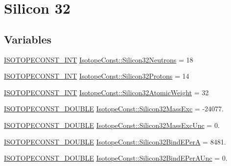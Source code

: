 \hypertarget{group___isotope_const-_silicon-_si32}{}\section{Silicon 32}
\label{group___isotope_const-_silicon-_si32}
\subsection*{Variables}
\begin{DoxyCompactItemize}
\item 
\mbox{\hyperlink{group___isotope_const-_macros_ga5f18360b3e99483a35c32d789e62621c}{I\+S\+O\+T\+O\+P\+E\+C\+O\+N\+S\+T\+\_\+\+I\+NT}} \mbox{\hyperlink{group___isotope_const-_silicon-_si32_ga544771607af4601906b75ff26619ab67}{Isotope\+Const\+::\+Silicon32\+Neutrons}} = 18
\item 
\mbox{\hyperlink{group___isotope_const-_macros_ga5f18360b3e99483a35c32d789e62621c}{I\+S\+O\+T\+O\+P\+E\+C\+O\+N\+S\+T\+\_\+\+I\+NT}} \mbox{\hyperlink{group___isotope_const-_silicon-_si32_ga0183e7fc8a1079c0e8dd019065cbc2f5}{Isotope\+Const\+::\+Silicon32\+Protons}} = 14
\item 
\mbox{\hyperlink{group___isotope_const-_macros_ga5f18360b3e99483a35c32d789e62621c}{I\+S\+O\+T\+O\+P\+E\+C\+O\+N\+S\+T\+\_\+\+I\+NT}} \mbox{\hyperlink{group___isotope_const-_silicon-_si32_gabdbf1f127fc4648df65b11e8da08e7bb}{Isotope\+Const\+::\+Silicon32\+Atomic\+Weight}} = 32
\item 
\mbox{\hyperlink{group___isotope_const-_macros_ga8f45a7272ce02c0b4c65c44636ed719a}{I\+S\+O\+T\+O\+P\+E\+C\+O\+N\+S\+T\+\_\+\+D\+O\+U\+B\+LE}} \mbox{\hyperlink{group___isotope_const-_silicon-_si32_ga59bcbda8aa85c3125ca5f58d077c73d5}{Isotope\+Const\+::\+Silicon32\+Mass\+Exc}} = -\/24077.
\item 
\mbox{\hyperlink{group___isotope_const-_macros_ga8f45a7272ce02c0b4c65c44636ed719a}{I\+S\+O\+T\+O\+P\+E\+C\+O\+N\+S\+T\+\_\+\+D\+O\+U\+B\+LE}} \mbox{\hyperlink{group___isotope_const-_silicon-_si32_gac2defc2a3c2076161426b64e57868950}{Isotope\+Const\+::\+Silicon32\+Mass\+Exc\+Unc}} = 0.
\item 
\mbox{\hyperlink{group___isotope_const-_macros_ga8f45a7272ce02c0b4c65c44636ed719a}{I\+S\+O\+T\+O\+P\+E\+C\+O\+N\+S\+T\+\_\+\+D\+O\+U\+B\+LE}} \mbox{\hyperlink{group___isotope_const-_silicon-_si32_gae7a637018f25af359bc13c1c0ce36161}{Isotope\+Const\+::\+Silicon32\+Bind\+E\+PerA}} = 8481.
\item 
\mbox{\hyperlink{group___isotope_const-_macros_ga8f45a7272ce02c0b4c65c44636ed719a}{I\+S\+O\+T\+O\+P\+E\+C\+O\+N\+S\+T\+\_\+\+D\+O\+U\+B\+LE}} \mbox{\hyperlink{group___isotope_const-_silicon-_si32_ga219930d12c5e29a854f63ba4ee0e0ef8}{Isotope\+Const\+::\+Silicon32\+Bind\+E\+Per\+A\+Unc}} = 0.

\end{DoxyCompactItemize}

